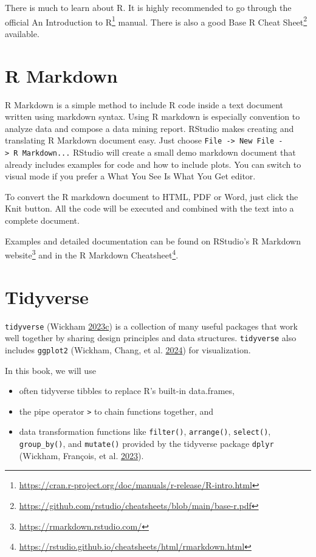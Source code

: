 \documentclass[
  notitlepage]{book}
\DeclareRobustCommand{\href}[2]{#2\footnote{\url{#1}}}
\providecommand{\tightlist}{%
  \setlength{\itemsep}{0pt}\setlength{\parskip}{0pt}}
\begin{document}
There is much to learn about R. It is highly recommended to go through
the official
\href{https://cran.r-project.org/doc/manuals/r-release/R-intro.html}{An Introduction to
R} manual.
There is also a good \href{https://github.com/rstudio/cheatsheets/blob/main/base-r.pdf}{Base R Cheat Sheet}
available.

\hypertarget{r-markdown}{%
\section{R Markdown}\label{r-markdown}}

R Markdown is a simple method to include R code inside a text document
written using markdown syntax. Using R markdown is especially convention to analyze
data and compose a data mining report. RStudio makes creating and
translating R Markdown document easy. Just choose
\texttt{File\ -\textgreater{}\ New\ File\ -\textgreater{}\ R\ Markdown...} RStudio will create a small
demo markdown document that already includes examples for code and how
to include plots. You can switch to visual mode if you prefer a What You
See Is What You Get editor.

To convert the R markdown document to HTML, PDF or Word, just click the
Knit button. All the code will be executed and combined with the text
into a complete document.

Examples and detailed documentation can be found on \href{https://rmarkdown.rstudio.com/}{RStudio's R Markdown
website} and in the \href{https://rstudio.github.io/cheatsheets/html/rmarkdown.html}{R Markdown Cheatsheet}.

\hypertarget{tidyverse}{%
\section{Tidyverse}\label{tidyverse}}

\texttt{tidyverse} (Wickham \protect\hyperlink{ref-R-tidyverse}{2023}\protect\hyperlink{ref-R-tidyverse}{c}) is a collection of many useful packages that
work well together by sharing design principles and data structures.
\texttt{tidyverse} also includes \texttt{ggplot2} (Wickham, Chang, et al. \protect\hyperlink{ref-R-ggplot2}{2024}) for visualization.

In this book, we will use

\begin{itemize}
\tightlist
\item
  often tidyverse tibbles to replace R's built-in data.frames,
\item
  the pipe operator \texttt{\textbar{}\textgreater{}} to chain functions together, and
\item
  data transformation functions like \texttt{filter()}, \texttt{arrange()},
  \texttt{select()}, \texttt{group\_by()}, and \texttt{mutate()} provided by the tidyverse
  package \texttt{dplyr} (Wickham, François, et al. \protect\hyperlink{ref-R-dplyr}{2023}).
\end{itemize}
\end{document}
